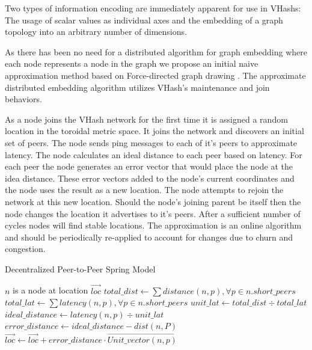 \documentclass{IEEEtran}
\begin{document}
Two types of information encoding are immediately apparent for use in VHashs: The usage of scalar values as individual axes and the embedding of a graph topology into an arbitrary number of dimensions.

As there has been no need for a distributed algorithm for graph embedding where each node represents a node in the graph we propose an initial naive approximation method based on Force-directed graph drawing \cite{Spring}.
The approximate distributed embedding algorithm utilizes VHash's maintenance and join behaviors.

As a node joins the VHash network for the first time it is assigned a random location in the toroidal metric space.
It joins the network and discovers an initial set of peers.
The node sends ping messages to each of it's peers to approximate latency.
The node calculates an ideal distance to each peer based on latency.
For each peer the node generates an error vector that would place the node at the idea distance.
These error vectors added to the node's current coordinates and the node uses the result as a new location.
The node attempts to rejoin the network at this new location. Should the node's joining parent be itself then the node changes the location it advertises to it's peers.
After a sufficient number of cycles nodes will find stable locations.
The approximation is an online algorithm and should be periodically re-applied to account for changes due to churn and congestion.


\begin{algorithm}
\caption{Decentralized Peer-to-Peer Spring Model}
\label{springalg}
\begin{algorithmic}[1] 
	\STATE $n$ is a node at location $\overrightarrow{loc}$
    \STATE $total\_dist \leftarrow \sum distance(n,p),\forall p \in n.short\_peers$
    \STATE $total\_lat \leftarrow \sum latency(n,p),\forall p \in n.short\_peers$
    \STATE $unit\_lat \leftarrow total\_dist \div total\_lat$
    	\STATE $ideal\_distance \leftarrow latency(n,p) \div unit\_lat$
        \STATE $error\_distance \leftarrow ideal\_distance - dist(n,P)$
        \STATE $\overrightarrow{loc} \leftarrow \overrightarrow{loc} + error\_distance \cdot \overrightarrow{Unit\_vector(n,p)} $
    \ENDFOR
\end{algorithmic}
\end{algorithm}
\end{document}

